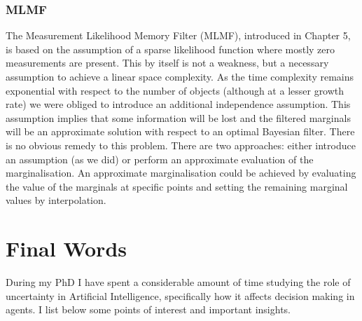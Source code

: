 \subsubsection{MLMF}
% 
%
The Measurement Likelihood Memory Filter (MLMF), introduced in Chapter 5, is based on 
the assumption of a sparse likelihood function where mostly zero measurements are present. 
This by itself is not a weakness, but a necessary assumption to achieve a linear space complexity. 
As the time complexity remains exponential with respect to the number of objects 
(although at a lesser growth rate) we were obliged to introduce an additional independence 
assumption. This assumption implies that some information will be lost and the filtered marginals will 
be an approximate solution with respect to an optimal Bayesian filter. There is no obvious remedy 
to this problem. There are two approaches: either introduce an assumption (as we did) or perform  
an approximate evaluation of the marginalisation. An approximate marginalisation could be achieved 
by evaluating the value of the marginals at specific points and setting the remaining marginal values by interpolation.

\section{Final Words}

During my PhD I have spent a considerable amount of time studying the role 
of uncertainty in Artificial Intelligence, specifically how it affects 
decision making in agents. I list below some points of interest and important 
insights.

